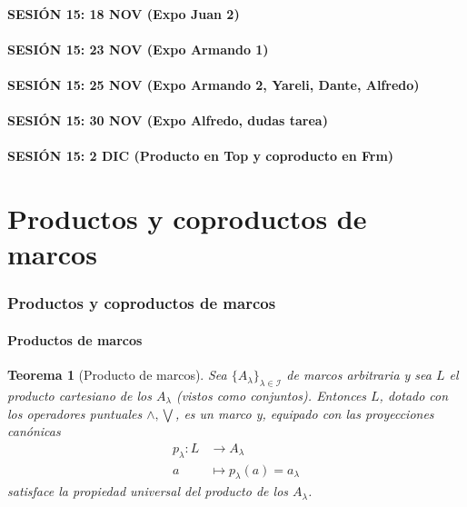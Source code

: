 \documentclass[12pt,letterpaper,titlepage]{article}
\newtheorem*{thm}{Teorema}
\theoremstyle{definition}
\newcommand\Sup{\bigvee}
\renewcommand\inf{\wedge}
\newcommand\<{\langle}
\renewcommand\>{\rangle}
\begin{document}
\subsection*{SESIÓN 15: 18 NOV (Expo Juan 2)}
\subsection*{SESIÓN 15: 23 NOV (Expo Armando 1)}
\subsection*{SESIÓN 15: 25 NOV (Expo Armando 2, Yareli, Dante, Alfredo)}
\subsection*{SESIÓN 15: 30 NOV (Expo Alfredo, dudas tarea)}
\subsection*{SESIÓN 15: 2 DIC (Producto en Top y coproducto en Frm)}

\part{Productos y coproductos de marcos}
\section{Productos y coproductos de marcos}
\subsection{Productos de marcos}

\begin{thm}[Producto de marcos]
    Sea $\{A_\lambda\}_{\lambda\in\mathscr{I}}$ de marcos arbitraria
    y sea $L$ el producto cartesiano de los $A_\lambda$
    (vistos como conjuntos).
    Entonces $L$, dotado con los operadores puntuales $\inf,\Sup$,
    es un marco y, equipado con las proyecciones canónicas
    \begin{align*}
        p_\lambda: L&\to A_\lambda \\
        a &\mapsto p_\lambda(a)=a_\lambda
    \end{align*}
    satisface la propiedad universal del producto de los $A_\lambda$.
\end{thm}
\end{document}
